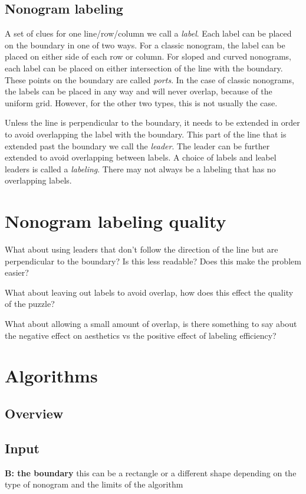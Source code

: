 \documentclass[a4paper]{article}
\begin{document}
\subsection{Nonogram labeling}
A set of clues for one line/row/column we call a \textit{label}. Each label can be placed on the boundary in one of two ways. For a classic nonogram, the label can be placed on either side of each row or column. For sloped and curved nonograms, each label can be placed on either intersection of the line with the boundary. These points on the boundary are called \textit{ports}. In the case of classic nonograms, the labels can be placed in any way and will never overlap, because of the uniform grid. However, for the other two types, this is not usually the case. 

Unless the line is perpendicular to the boundary, it needs to be extended in order to avoid overlapping the label with the boundary. This part of the line that is extended past the boundary we call the \textit{leader}. The leader can be further extended to avoid overlapping between labels. A choice of labels and leabel leaders is called a \textit{labeling}. There may not always be a labeling that has no overlapping labels.

\section{Nonogram labeling quality}

What about using leaders that don't follow the direction of the line but are perpendicular to the boundary? Is this less readable? Does this make the problem easier?

What about leaving out labels to avoid overlap, how does this effect the quality of the puzzle?

What about allowing a small amount of overlap, is there something to say about the negative effect on aesthetics vs the positive effect of labeling efficiency?

\section{Algorithms}

\subsection{Overview}

\subsection{Input}
\textbf{B: the boundary} this can be a rectangle or a different shape depending on the type of nonogram and the limits of the algorithm
\end{document}
